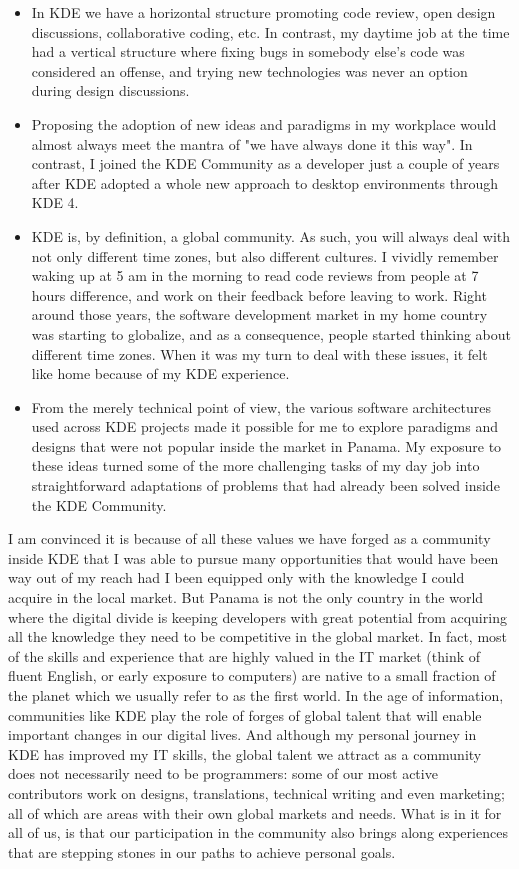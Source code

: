 \begin{itemize}
\item In KDE we have a horizontal structure promoting code review,
  open design discussions, collaborative coding, etc. In contrast, my
  daytime job at the time had a vertical structure where fixing bugs
  in somebody else's code was considered an offense, and trying new
  technologies was never an option during design discussions.
\item Proposing the adoption of new ideas and paradigms in my
  workplace would almost always meet the mantra of "we have always
  done it this way". In contrast, I joined the KDE Community as a
  developer just a couple of years after KDE adopted a whole new
  approach to desktop environments through KDE 4.
\item KDE is, by definition, a global community. As such, you will
  always deal with not only different time zones, but also different
  cultures. I vividly remember waking up at 5 am in the morning to
  read code reviews from people at 7 hours difference, and work on
  their feedback before leaving to work. Right around those years, the
  software development market in my home country was starting to
  globalize, and as a consequence, people started thinking about
  different time zones. When it was my turn to deal with these issues,
  it felt like home because of my KDE experience.
\item From the merely technical point of view, the various software
  architectures used across KDE projects made it possible for me to
  explore paradigms and designs that were not popular inside the
  market in Panama. My exposure to these ideas turned some of the more
  challenging tasks of my day job into straightforward adaptations of
  problems that had already been solved inside the KDE Community.
\end{itemize}

I am convinced it is because of all these values we have forged
as a community inside KDE that I was able to pursue many opportunities
that would have been way out of my reach had I been equipped only with the
knowledge I could acquire in the local market. But Panama is not the
only country in the world where the digital divide is keeping
developers with great potential from acquiring all the knowledge they
need to be competitive in the global market. In fact, most of the
skills and experience that are highly valued in the IT market (think
of fluent English, or early exposure to computers) are native to a
small fraction of the planet which we usually refer to as the first
world. In the age of information, communities like KDE play the role
of forges of global talent that will enable important changes in our
digital lives. And although my personal journey in KDE has improved my
IT skills, the global talent we attract as a community does not
necessarily need to be programmers: some of our most active
contributors work on designs, translations, technical writing and even
marketing; all of which are areas with their own global markets and
needs. What is in it for all of us, is that our participation in the
community also brings along experiences that are stepping stones in
our paths to achieve personal goals.

